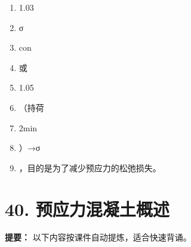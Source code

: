 \documentclass[UTF8,fontset=fandol,11pt]{ctexart}
\begin{document}
\begin{enumerate}[label=\arabic*.]
\item 1.03

\item σ

\item con

\item 或

\item 1.05

\item （持荷

\item 2min

\item ）→σ

\item ，目的是为了减少预应力的松弛损失。

\end{enumerate}

\newpage

\section*{40. 预应力混凝土概述}


\begin{mainbox}

\textbf{提要：} 以下内容按课件自动提炼，适合快速背诵。

\end{mainbox}
\end{document}

